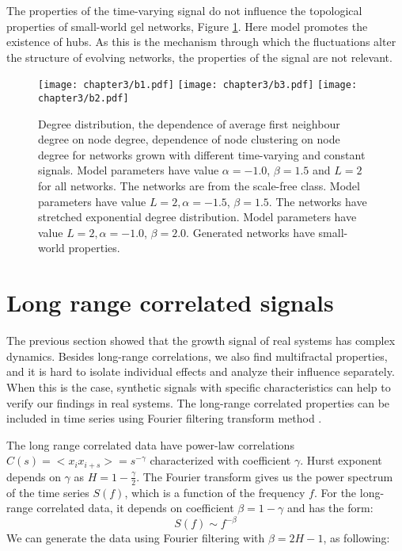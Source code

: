 The properties of the time-varying signal do not influence the topological properties of small-world gel networks, Figure \ref{fig:properties_net}. Here model promotes the existence of hubs. As this is the mechanism through which the fluctuations alter the structure of evolving networks, the properties of the signal are not relevant.   

\begin{figure}[H]
	\centering
	\texttt{[image: chapter3/b1.pdf]}
	\texttt{[image: chapter3/b3.pdf]}
	\texttt{[image: chapter3/b2.pdf]}
	\caption[Structural properties of networks.]{Degree distribution, the dependence of average first neighbour degree on node degree, dependence of node clustering on node degree for networks grown with different time-varying and constant signals. Model parameters have value $\alpha=-1.0$, $\beta=1.5$  and $L=2$ for all networks. The networks are from the scale-free class. Model parameters have value $L=2, \alpha=-1.5$, $\beta=1.5$. The networks have stretched exponential degree distribution. Model parameters have value $ L=2, \alpha=-1.0$, $\beta=2.0$. Generated networks have small-world properties.}
	\label{fig:properties_net}
\end{figure}

\section{Long range correlated signals}

The previous section showed that the growth signal of real systems has complex dynamics. Besides long-range correlations, we also find multifractal properties, and it is hard to isolate individual effects and analyze their influence separately. When this is the case, synthetic signals with specific characteristics can help to verify our findings in real systems. The long-range correlated properties can be included in time series using Fourier filtering transform method \cite{makse1996method}. 

The long range correlated data have power-law correlations $C(s)= <x_i x_{i+s}> = s ^ {-\gamma}$ characterized with coefficient $\gamma$. Hurst exponent depends on $\gamma$ as  $H = 1- \frac{\gamma}{2}$. The Fourier transform gives us the power spectrum of the time series $S(f)$, which is a function of the frequency $f$. For the long-range correlated data, it depends on coefficient $\beta = 1-\gamma$ and has the form:
\begin{equation}
S(f) \sim f^{-\beta}
\end{equation}
We can generate the data using Fourier filtering with $\beta = 2H - 1$, as following:

